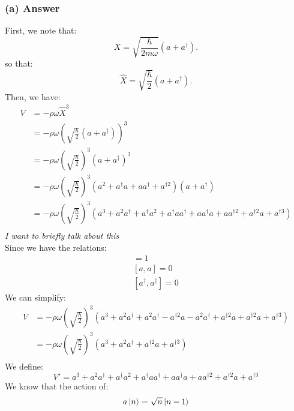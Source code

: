 \documentclass{article}
\begin{document}
\subsubsection*{(a) Answer}
First, we note that:
\begin{equation}
    X = \sqrt{\frac{\hbar}{2m\omega}}(a + a^\dagger).
\end{equation}
so that:
\begin{equation}
    \hat{X} = \sqrt{\frac{\hbar}{2}}(a + a^\dagger).
\end{equation}
Then, we have:
\begin{align}
    V &= -\rho \omega \hat{X}^3 \\
    &= -\rho \omega \left( \sqrt{\frac{\hbar}{2}}(a + a^\dagger) \right)^3 \\
    &= -\rho \omega \left( \sqrt{\frac{\hbar}{2}} \right)^3 (a + a^\dagger)^3 \\
    &= -\rho \omega \left( \sqrt{\frac{\hbar}{2}} \right)^3 (a^2 + a^\dagger a + aa^\dagger + a^{\dagger 2}) (a + a^\dagger) \\
    &= -\rho \omega \left( \sqrt{\frac{\hbar}{2}} \right)^3 (a^3 + a^2a^\dagger + a^{\dagger}a^2 + a^{\dagger}aa^{\dagger} + aa^{\dagger}a + aa^{\dagger 2} + a^{\dagger 2}a + a^{\dagger 3}) \\
\end{align}
\emph{I want to briefly talk about this}\\
Since we have the relations:
\begin{align}
    [a, a^\dagger] = 1 \\
    [a, a] = 0 \\
    [a^\dagger, a^\dagger] = 0
\end{align}
We can simplify:
\begin{align}
    V &= -\rho \omega \left( \sqrt{\frac{\hbar}{2}} \right)^3 (a^3 + a^2a^\dagger + a^2a^{\dag} - a^{\dag 2}a - a^2a^{\dagger } + a^{\dagger 2}a + a^{\dag 2}a + a^{\dagger 3}) \\
    &= -\rho \omega \left( \sqrt{\frac{\hbar}{2}} \right)^3 (a^3 + a^2a^\dagger + a^{\dagger 2}a + a^{\dagger 3}) \\
\end{align}
We define:
\begin{equation}
    V' = a^3 + a^2a^\dagger + a^{\dagger}a^2 + a^{\dagger}aa^{\dagger} + aa^{\dagger}a + aa^{\dagger 2} + a^{\dagger 2}a + a^{\dagger 3}
\end{equation}
We know that the action of:
\begin{equation}
    a\ket{n} = \sqrt{n}\ket{n-1}
\end{equation}
\end{document}
